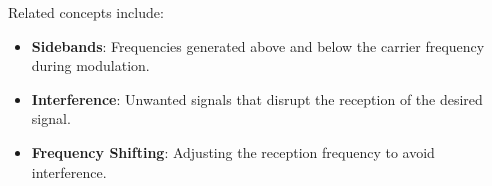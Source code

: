 Related concepts include:
\begin{itemize}
    \item \textbf{Sidebands}: Frequencies generated above and below the carrier frequency during modulation.
    \item \textbf{Interference}: Unwanted signals that disrupt the reception of the desired signal.
    \item \textbf{Frequency Shifting}: Adjusting the reception frequency to avoid interference.
\end{itemize}

